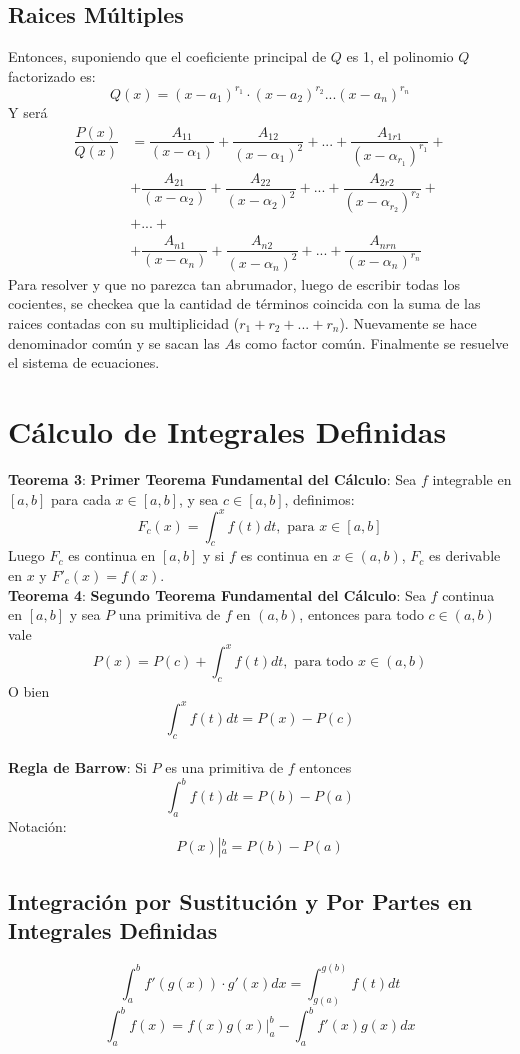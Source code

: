 \documentclass[11pt,a4paper]{article}
\begin{document}
\subsection{Raices M\'ultiples}
Entonces, suponiendo que el coeficiente principal de $Q$ es 1, el polinomio $Q$ factorizado es: $$Q(x) = (x-a_1)^{r_1} \cdot (x-a_2)^{r_2} ... (x-a_n)^{r_n}$$
Y ser\'a 
\begin{align*}
\dfrac{P(x)}{Q(x)} 
&= \dfrac{A_{11}}{(x-\alpha_1)} + \dfrac{A_{12}}{(x-\alpha_1)^2} + ... + \dfrac{A_{1r1}}{(x-\alpha_{r_1})^{r_1}} + \\ 
&+ \dfrac{A_{21}}{(x-\alpha_2)} + \dfrac{A_{22}}{(x-\alpha_2)^2} + ... + \dfrac{A_{2r2}}{(x-\alpha_{r_2})^{r_2}} + \\
&+ ... +\ \\
&+ \dfrac{A_{n1}}{(x-\alpha_n)} + \dfrac{A_{n2}}{(x-\alpha_n)^2} + ... + \dfrac{A_{nrn}}{(x-\alpha_{n})^{r_n}}
\end{align*}
Para resolver y que no parezca tan abrumador, luego de escribir todas los cocientes, se checkea que la cantidad de t\'erminos coincida con la suma de las raices contadas con su multiplicidad ($r_1+r_2+...+r_n$). Nuevamente se hace denominador com\'un y se sacan las $A$s como factor com\'un. Finalmente se resuelve el sistema de ecuaciones.

\section{C\'alculo de Integrales Definidas} 
\textbf{Teorema 3}: \textbf{Primer Teorema Fundamental del C\'alculo}: Sea $f$ integrable en $[a,b]$ para cada $x\in[a,b]$, y sea $c\in[a,b]$, definimos: $$F_c(x) = \int_{c}^{x} f(t)dt, \text{ para $x \in [a,b]$}$$
Luego $F_c$ es continua en $[a,b]$ y si $f$ es continua en $x\in(a,b)$, $F_c$ es derivable en $x$ y $F'_c(x)=f(x)$.\\

\noindent \textbf{Teorema 4}: \textbf{Segundo Teorema Fundamental del C\'alculo}: Sea $f$ continua en $[a,b]$ y sea $P$ una primitiva de $f$ en $(a,b)$, entonces para todo $c\in(a,b)$ vale $$P(x) = P(c) + \int^x_c f(t)dt, \text{ para todo $x\in(a,b)$}$$
O bien $$\int^x_cf(t)dt = P(x)-P(c)$$\\

\noindent \textbf{Regla de Barrow}: Si $P$ es una primitiva de $f$ entonces $$\int_a^b f(t)dt = P(b)-P(a)$$
Notaci\'on: $$P(x)\left|^b_a = P(b)-P(a) \right.$$

\subsection{Integraci\'on por Sustituci\'on y Por Partes en Integrales Definidas}
$$\int_a^b f'(g(x))\cdot g'(x)dx = \int_{g(a)}^{g(b)} f(t)dt$$
$$\int_a^b f(x)=f(x)g(x)|^b_a - \int_a^bf'(x)g(x)dx$$
\end{document}
